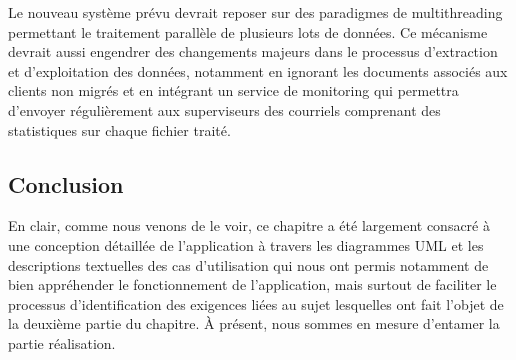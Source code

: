 Le nouveau système prévu devrait reposer sur des paradigmes de multithreading permettant le traitement parallèle de plusieurs lots de données. Ce mécanisme devrait aussi engendrer des changements majeurs dans le processus d'extraction et d'exploitation des données, notamment en ignorant les documents associés aux clients non migrés et en intégrant un service de monitoring qui permettra d'envoyer régulièrement aux superviseurs des courriels comprenant des statistiques sur chaque fichier traité.\\


\subsection*{Conclusion}
En clair, comme nous venons de le voir, ce chapitre a été largement consacré à une conception détaillée de l'application à travers les diagrammes UML et les descriptions textuelles des cas d'utilisation qui nous ont permis notamment de bien appréhender le fonctionnement de l'application, mais surtout de faciliter le processus d'identification des exigences liées au sujet lesquelles ont fait l'objet de la deuxième partie du chapitre. À présent, nous sommes en mesure d'entamer la partie réalisation.
